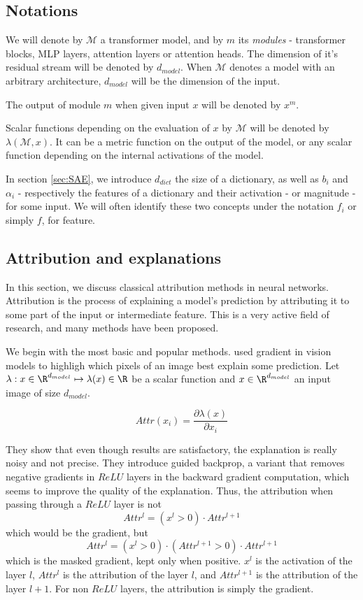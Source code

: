 \documentclass{article}
\begin{document}


\subsection{Notations}

We will denote by $\mathcal{M}$ a transformer model, and by $m$ its \textit{modules} - transformer blocks, MLP layers, attention layers or attention heads. The dimension of it's residual stream will be denoted by $d_{model}$. When $\mathcal{M}$ denotes a model with an arbitrary architecture, $d_{model}$ will be the dimension of the input.

The output of module $m$ when given input $x$ will be denoted by $x^m$.

Scalar functions depending on the evaluation of $x$ by $\mathcal{M}$ will be denoted by $\lambda(\mathcal{M}, x)$. It can be a metric function on the output of the model, or any scalar function depending on the internal activations of the model.

In section \ref{sec:SAE}, we introduce $d_{dict}$ the size of a dictionary, as well as $b_i$ and $\alpha_i$ - respectively the features of a dictionary and their activation - or magnitude - for some input. We will often identify these two concepts under the notation $f_i$ or simply $f$, for feature.

\subsection{Attribution and explanations}

In this section, we discuss  classical attribution methods in neural networks. Attribution is the process of explaining a model's prediction by attributing it to some part of the input or intermediate feature. This is a very active field of research, and many methods have been proposed.

We begin with the most basic and popular methods. \citet{springenberg2015strivingGuidedBackprop} used gradient in vision models to highligh which pixels of an image best explain some prediction. Let $\lambda : x \in \R^{d_{model}} \mapsto \lambda(x) \in \R$ be a scalar function and $x \in \R^{d_{model}}$ an input image of size $d_{model}$.

$$ Attr(x_i) = \frac{\partial \lambda(x)}{\partial x_i} $$

They show that even though results are satisfactory, the explanation is really noisy and not precise. They introduce guided backprop, a variant that removes negative gradients in $ReLU$ layers in the backward gradient computation, which seems to improve the quality of the explanation.
Thus, the attribution when passing through a $ReLU$ layer is not
$$ Attr^l = (x^l > 0) \cdot Attr^{l+1} $$
which would be the gradient, but
$$ Attr^l = (x^l > 0) \cdot (Attr^{l+1} > 0) \cdot Attr^{l+1} $$
which is the masked gradient, kept only when positive. $x^l$ is the activation of the layer $l$, $Attr^l$ is the attribution of the layer $l$, and $Attr^{l+1}$ is the attribution of the layer $l+1$. For non $ReLU$ layers, the attribution is simply the gradient.
\end{document}
